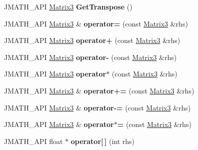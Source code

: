 \begin{DoxyCompactItemize}
\item 
\hypertarget{class_matrix3_a66175d0cddc2e07edce17c47347c6dbc}{J\+M\+A\+T\+H\+\_\+\+A\+P\+I \hyperlink{class_matrix3}{Matrix3} {\bfseries Get\+Transpose} ()}\label{class_matrix3_a66175d0cddc2e07edce17c47347c6dbc}

\item 
\hypertarget{class_matrix3_a53a433fe9599331a68733b86448a1ec3}{J\+M\+A\+T\+H\+\_\+\+A\+P\+I \hyperlink{class_matrix3}{Matrix3} \& {\bfseries operator=} (const \hyperlink{class_matrix3}{Matrix3} \&rhs)}\label{class_matrix3_a53a433fe9599331a68733b86448a1ec3}

\item 
\hypertarget{class_matrix3_add7e3b870506b88ce70d85451a843be8}{J\+M\+A\+T\+H\+\_\+\+A\+P\+I \hyperlink{class_matrix3}{Matrix3} {\bfseries operator+} (const \hyperlink{class_matrix3}{Matrix3} \&rhs)}\label{class_matrix3_add7e3b870506b88ce70d85451a843be8}

\item 
\hypertarget{class_matrix3_a316bb301248343e2e670cdb4bcf6105b}{J\+M\+A\+T\+H\+\_\+\+A\+P\+I \hyperlink{class_matrix3}{Matrix3} {\bfseries operator-\/} (const \hyperlink{class_matrix3}{Matrix3} \&rhs)}\label{class_matrix3_a316bb301248343e2e670cdb4bcf6105b}

\item 
\hypertarget{class_matrix3_aef5de1b0d8f31620f2f2fc1d012417a4}{J\+M\+A\+T\+H\+\_\+\+A\+P\+I \hyperlink{class_matrix3}{Matrix3} {\bfseries operator$\ast$} (const \hyperlink{class_matrix3}{Matrix3} \&rhs)}\label{class_matrix3_aef5de1b0d8f31620f2f2fc1d012417a4}

\item 
\hypertarget{class_matrix3_aff2bfe382becfa00eb2e23e784d4379a}{J\+M\+A\+T\+H\+\_\+\+A\+P\+I \hyperlink{class_matrix3}{Matrix3} \& {\bfseries operator+=} (const \hyperlink{class_matrix3}{Matrix3} \&rhs)}\label{class_matrix3_aff2bfe382becfa00eb2e23e784d4379a}

\item 
\hypertarget{class_matrix3_ae1f9d969ae85d83b4efc936b993d29c5}{J\+M\+A\+T\+H\+\_\+\+A\+P\+I \hyperlink{class_matrix3}{Matrix3} \& {\bfseries operator-\/=} (const \hyperlink{class_matrix3}{Matrix3} \&rhs)}\label{class_matrix3_ae1f9d969ae85d83b4efc936b993d29c5}

\item 
\hypertarget{class_matrix3_a619e77a133a4626353a3af554cd53636}{J\+M\+A\+T\+H\+\_\+\+A\+P\+I \hyperlink{class_matrix3}{Matrix3} \& {\bfseries operator$\ast$=} (const \hyperlink{class_matrix3}{Matrix3} \&rhs)}\label{class_matrix3_a619e77a133a4626353a3af554cd53636}

\item 
\hypertarget{class_matrix3_a8f5523aa2a93a70b399a7826b9997a31}{J\+M\+A\+T\+H\+\_\+\+A\+P\+I float $\ast$ {\bfseries operator\mbox{[}$\,$\mbox{]}} (int rhs)}\label{class_matrix3_a8f5523aa2a93a70b399a7826b9997a31}

\end{DoxyCompactItemize}
